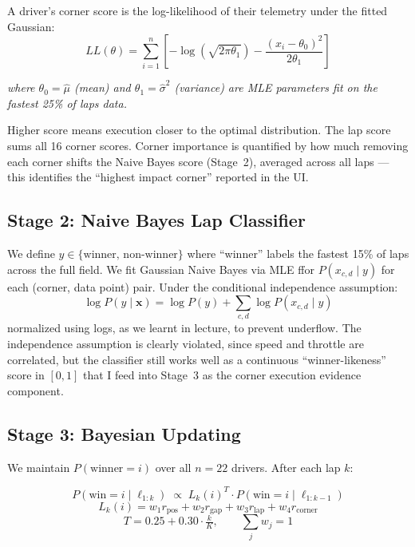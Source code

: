 \documentclass[10pt,twocolumn]{article}
\begin{document}
A driver's corner score is the log-likelihood of their telemetry under the fitted Gaussian:
\[
LL(\theta) = \sum_{i=1}^{n} \left[
    -\log(\sqrt{2\pi\theta_1})
    - \frac{(x_i - \theta_0)^2}{2\theta_1}
\right]
\]
\begin{center}
    \textit{\small where $\theta_0 = \hat{\mu}$ (mean) and $\theta_1 = \hat{\sigma}^2$ (variance) are MLE parameters fit on the fastest 25\% of laps data.}
\end{center}

Higher score means execution closer to the optimal distribution. The lap score
sums all 16 corner scores. Corner importance is quantified by how much removing
each corner shifts the Naive Bayes score (Stage~2), averaged across all laps ---
this identifies the ``highest impact corner'' reported in the UI.

\subsection{Stage 2: Naive Bayes Lap Classifier}

We define $y \in \{\text{winner, non-winner}\}$ where ``winner'' labels the
fastest 15\% of laps across the full field. We fit Gaussian Naive Bayes via MLE
ffor $P(x_{c,d} \mid y)$ for each (corner, data point) pair. Under the conditional
independence assumption:
\[
  \log P(y \mid \mathbf{x}) = \log P(y) + \sum_{c,d} \log P(x_{c,d} \mid y)
\]
normalized using logs, as we learnt in lecture, to prevent underflow. The independence assumption
is clearly violated, since speed and throttle are correlated, but the
classifier still works well as a continuous ``winner-likeness'' score in $[0,1]$ that
I feed into Stage~3 as the corner execution evidence component.

\subsection{Stage 3: Bayesian Updating}

We maintain $P(\text{winner} = i)$ over all $n = 22$ drivers. After each lap $k$:

\begin{infobox}
\[
  P(\text{win}=i \mid \ell_{1:k}) \;\propto\; L_k(i)^T \cdot P(\text{win}=i \mid \ell_{1:k-1})
\]
\[
  L_k(i) = w_1 r_{\text{pos}} + w_2 r_{\text{gap}} + w_3 r_{\text{lap}} + w_4 r_{\text{corner}}
\]
\[
  T = 0.25 + 0.30\cdot\tfrac{k}{K}, \qquad \textstyle\sum_j w_j = 1
\]
\end{infobox}
\end{document}
